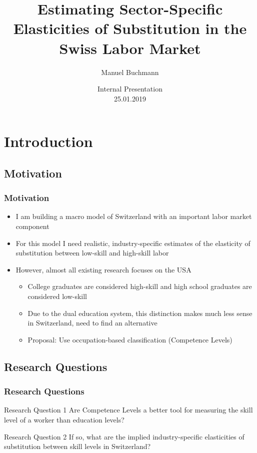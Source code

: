 \documentclass[11pt]{beamer} \usetheme{Frankfurt}
\author{Manuel Buchmann}
\title[Elasticities]{Estimating Sector-Specific Elasticities of
  Substitution in the Swiss Labor Market}
\date[\today]{Internal Presentation\\25.01.2019}
\begin{document}
\maketitle
\section{Introduction}
\subsection{Motivation}
\begin{frame}
  \frametitle{Motivation}
  \begin{itemize}
  \item I am building a macro model of Switzerland with an important
    labor market component
  \item For this model I need realistic, industry-specific estimates
    of the elasticity of substitution between low-skill and high-skill
    labor
  \item However, almost all existing research focuses on the USA
    \begin{itemize}
    \item College graduates are considered high-skill and high school
      graduates are considered low-skill
    \item Due to the dual education system, this distinction makes
      much less sense in Switzerland, need to find an alternative
    \item Proposal: Use occupation-based classification (Competence
      Levels)
    \end{itemize}
  \end{itemize}
\end{frame}

\subsection{Research Questions}
\begin{frame}
  \frametitle{Research Questions}
  \begin{block}{Research Question 1}
    Are Competence Levels a better tool for measuring the skill level
    of a worker than education levels?
  \end{block}
  \begin{block}{Research Question 2}
    If so, what are the implied industry-specific elasticities of
    substitution between skill levels in Switzerland?
  \end{block}
\end{frame}
\end{document}

